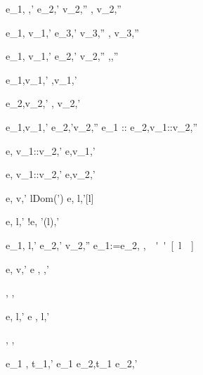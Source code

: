   {e_1,{\sigma}{\eval} \True,{\sigma}'\Quad
   e_2,{\sigma}'{\eval} {v_2},{\sigma}''}
  {,{\sigma}{\eval} {v_2},{\sigma}''}

  {e_1,{\sigma}{\eval} {v_1},{\sigma}' \Quad
   e_3,{\sigma}'{\eval} {v_3},{\sigma}''}
  {,{\sigma}{\eval} {v_3},{\sigma}''}


  {e_1,{\sigma}{\eval} {v_1},{\sigma}' \Quad
   e_2,{\sigma}'{\eval} {v_2},{\sigma}''}
  {,{\sigma}{\eval},{\sigma}''}

  {e_1,{\sigma}{\eval}{v_1},{\sigma}'}
  {\Fst{},{\sigma}{\eval}{v_1},{\sigma}'}

  {e_2,{\sigma}{\eval}{v_2},{\sigma}'}
  {\Snd{},{\sigma}{\eval} {v_2},{\sigma}' }


  {e_1,{\sigma}{\eval}{v_1},{\sigma}'\Quad
   e_2,{\sigma}'{\eval}{v_2},{\sigma}''}
  {e_1 :: e_2,{\sigma}{\eval}{v_1}::{v_2},{\sigma}''}

  {e,{\sigma}{\eval} {v_1}::{v_2},{\sigma}'}
  {\Head e,{\sigma}{\eval}{v_1},{\sigma}'}

{e,{\sigma}{\eval} {v_1}::{v_2},{\sigma}'}
{\Tail e,{\sigma}{\eval}{v_2},{\sigma}'}



  {e,{\sigma}{\eval} {v},{\sigma}' \Quad
   l\not\in Dom({\sigma}')}
  {\Ref e,{\sigma}{\eval} l,{\sigma}'[l]}

  {e,{\sigma}{\eval} l,{\sigma}'}
  {!e,{\sigma}{\eval} {\sigma}'(l),{\sigma}'}

  {e_1,{\sigma}{\eval} l,{\sigma}' \Quad
   e_2,{\sigma}'{\eval} {v_2},{\sigma}''}
  {e_1:=e_2,{\sigma}{\eval} \unit,{\sigma}''[l]}

  {e,{\sigma} {\eval} {v},{\sigma}'}
  {\Edit e , {\sigma}{\eval} ,{\sigma}'}

  {}
  {\Enter \tau,{\sigma} {\eval} \Enter \tau,{\sigma}}

  {e,{\sigma}{\eval} l,{\sigma}'}
  {\Update e ,{\sigma}{\eval} \Update l,{\sigma}'}


  {}
  {\Fail,{\sigma} {\eval} \Fail,{\sigma}}


  {e_1 ,{\sigma}{\eval} {t_1},{\sigma}'}
  {e_1 \Then e_2,{\sigma}{\eval}{t_1} \Then e_2,{\sigma}'}

